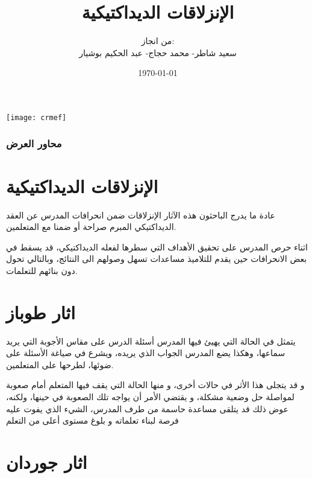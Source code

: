 \documentclass[16pt]{beamer}
\title[الإنزلاقات الديداكتيكية]{الإنزلاقات الديداكتيكية}
\author[المركز الجهوي لمهن التربية والتكوين بني ملال-خنيفرة]{من انجاز:\\ سعيد شاطر- محمد حجاج- عبد الحكيم بوشيار}
\date[\today] {\today}
\begin{document}
\begin{frame}
\begin{center}
\texttt{[image: crmef]}
\end{center}
\titlepage
\end{frame}
\begin{frame}\frametitle{محاور العرض }
\tableofcontents
\end{frame}

\section{الإنزلاقات الديداكتيكية}
\begin{frame}
\begin{block}{}
عادة ما يدرج الباحثون هذه الآثار الإنزلاقات ضمن انحرافات المدرس عن العقد الديداكتيكي المبرم صراحة أو ضمنا مع المتعلمين.
\end{block}
\pause
\begin{block}{}
اثناء حرص المدرس على تحقيق الأهداف التي سطرها لفعله الديداكتيكي، قد يسقط في بعض الانحرافات حين يقدم للتلاميذ مساعدات تسهل وصولهم الى النتائج، وبالتالي تحول دون بنائهم للتعلمات.
\end{block}
\end{frame}
\section{اثار طوباز}
\begin{frame}{}

\begin{block}{}
 يتمثل في الحالة التي يهيئ فيها المدرس أسئلة الدرس على مقاس الأجوبة التي يريد سماعها، وهكذا يضع المدرس الجواب الذي يريده، ويشرع في صياغة الأسئلة على ضوئها، لطرحها على المتعلمين.
\end{block}
\pause
\begin{block}{}
 و قد يتجلى هذا الأثر في حالات أخرى، و منها الحالة التي يقف فيها المتعلم أمام صعوبة لمواصلة حل وضعية مشكلة، و يقتضي الأمر أن يواجه تلك الصعوبة في حينها، ولكنه، عوض ذلك قد يتلقى مساعدة حاسمة من طرف المدرس، الشيء الذي يفوت عليه فرصة لبناء تعلماته و بلوغ مستوى أعلى من التعلم
\end{block}
\end{frame}
\section{اثار جوردان}
\end{document}
